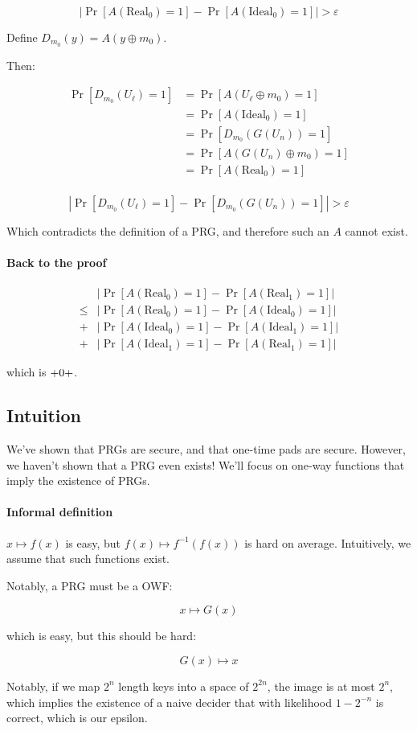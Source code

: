 \documentclass{idc_msc}
\DeclareMathOperator*{\xor}{\oplus}
\let\negligible\relax
\DeclareMathOperator*{\negligible}{\mathrm{neg}}
\begin{document}
\[
  |\Pr[A(\mathrm{Real}_0) = 1] - \Pr[A(\mathrm{Ideal}_0) = 1]| > \varepsilon
\]

Define \(D_{m_0}(y) = A(y \xor m_0)\).

Then:

\[
\begin{aligned}
  \Pr[D_{m_0}(U_\ell) = 1] &= \Pr[A(U_\ell \xor m_0) = 1] \\
  &= \Pr[A(\mathrm{Ideal}_0) = 1] \\
  &= \Pr[D_{m_0}(G(U_n)) = 1] \\
  &= \Pr[A(G(U_n) \xor m_0) = 1] \\
  &= \Pr[A(\mathrm{Real}_0) = 1] \\
\end{aligned}
\]

\[
  |\Pr[D_{m_0}(U_\ell) = 1] - \Pr[D_{m_0}(G(U_n)) = 1]| > \varepsilon
\]

Which contradicts the definition of a PRG, and therefore such an \(A\) cannot exist.

\paragraph{Back to the proof}

\[
\begin{aligned}
  & |\Pr[A(\mathrm{Real}_0) = 1] - \Pr[A(\mathrm{Real}_1) = 1]| \\
  \le& |\Pr[A(\mathrm{Real}_0) = 1] - \Pr[A(\mathrm{Ideal}_0) = 1]| \\
  +& |\Pr[A(\mathrm{Ideal}_0) = 1] - \Pr[A(\mathrm{Ideal}_1) = 1]| \\
  +& |\Pr[A(\mathrm{Ideal}_1) = 1] - \Pr[A(\mathrm{Real}_1) = 1]|
\end{aligned}
\]

which is \(\negligible + 0 + \negligible\).

\subsection{Intuition}

We've shown that PRGs are secure, and that one-time pads are secure.
However, we haven't shown that a PRG even exists!
We'll focus on one-way functions that imply the existence of PRGs.

\paragraph{Informal definition}

\(x \mapsto f(x)\) is easy, but \(f(x) \mapsto f^{-1}(f(x))\) is hard on average.
Intuitively, we assume that such functions exist.

Notably, a PRG must be a OWF:

\[
  x \mapsto G(x)
\]

which is easy, but this should be hard:

\[
  G(x) \mapsto x
\]

Notably, if we map \(2^n\) length keys into a space of \(2^{2n}\), the image is at most \(2^n\), which implies the existence of a naive decider that with likelihood \(1-2^{-n}\) is correct, which is our epsilon.
\end{document}
